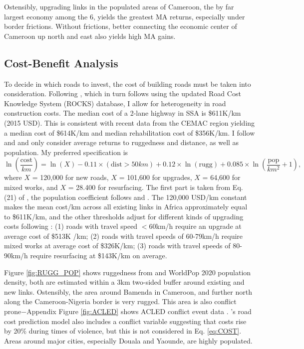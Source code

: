\documentclass[a4paper]{article}
\begin{document}
Ostensibly, upgrading links in the populated areas of Cameroon, the by far largest economy among the 6, yields the greatest MA returns, especially under border frictions. Without frictions, better connecting the economic center of Cameroon up north and east also yields high MA gains.  

\subsection{Cost-Benefit Analysis}

To decide in which roads to invest, the cost of building roads must be taken into consideration. Following \citet{krantz2024optimal}, which in turn follows \citet{collier2016cost} using the updated Road Cost Knowledge System (ROCKS) database, I allow for heterogeneity in road construction costs. The median cost of a 2-lane highway in SSA is \$611K/km (2015 USD). This is consistent with recent data from the CEMAC region yielding a median cost of \$614K/km and median rehabilitation cost of \$356K/km. I follow \citet{fajgelbaum2020optimal} and \citet{graff2024spatial} and only consider average returns to ruggedness and distance, as well as population. My preferred specification is 
\begin{equation} \label{eq:COST}
\ln\left(\frac{\text{cost}}{km}\right) = \ln(X) -0.11 \times (\text{dist} > 50km) + 0.12 \times \ln(\text{rugg}) + 0.085 \times \ln\left(\frac{\text{pop}}{km^2}+1\right),
\end{equation}
where $X$ = 120,000 for new roads, $X$ = 101,600 for upgrades, $X$ = 64,600 for mixed works, and $X$ = 28.400 for resurfacing. The first part is taken from Eq. (21) of \citet{fajgelbaum2020optimal}, the population coefficient follows \citet{collier2016cost} and \citet{krantz2024optimal}. The 120,000 USD/km constant makes the mean cost/km across all existing links in Africa approximately equal to \$611K/km, and the other thresholds adjust for different kinds of upgrading costs following \citet{krantz2024optimal}: (1) roads with travel speed $<$60km/h require an upgrade at average cost of \$513K /km; (2) roads with travel speeds of 60-79km/h require mixed works at average cost of \$326K/km; (3) roads with travel speeds of 80-90km/h require resurfacing at \$143K/km on average. \newline 

Figure \ref{fig:RUGG_POP} shows ruggedness from \citet{nunn2012ruggedness} and WorldPop 2020 population density, both are estimated within a 3km two-sided buffer around existing and new links. Ostensibly, the area around Bamenda in Cameroon, and further north along the Cameroon-Nigeria border is very rugged. This area is also conflict prone$-$Appendix Figure \ref{fig:ACLED} shows ACLED conflict event data \citep{raleigh2023political}. \citet{collier2016cost}'s road cost prediction model also includes a conflict variable suggesting that costs rise by 20\% during times of violence, but this is not considered in Eq. \ref{eq:COST}. Areas around major cities, especially Douala and Yaounde, are highly populated. 
\end{document}
